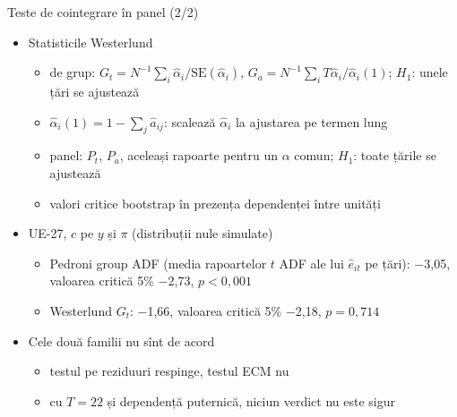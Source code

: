 \begin{frame}{Teste de cointegrare în panel (2/2)}
\itemsize{\small}
\begin{itemize}
    \item Statisticile Westerlund
    \begin{itemize}
        \item de grup: $G_t = N^{-1}\sum_i\hat\alpha_i/\mathrm{SE}(\hat\alpha_i)$, $G_a = N^{-1}\sum_i T\hat\alpha_i/\hat\alpha_i(1)$; $H_1$: unele țări se ajustează
        \item $\hat\alpha_i(1) = 1 - \sum_j\hat a_{ij}$: scalează $\hat\alpha_i$ la ajustarea pe termen lung
        \item panel: $P_t$, $P_a$, aceleași rapoarte pentru un $\alpha$ comun; $H_1$: toate țările se ajustează
        \item valori critice bootstrap în prezența dependenței între unități
    \end{itemize}
    \item UE-27, $c$ pe $y$ și $\pi$ (distribuții nule simulate)
    \begin{itemize}
        \item Pedroni group ADF (media rapoartelor $t$ ADF ale lui $\hat e_{it}$ pe țări): \ensuremath{-}3{,}05, valoarea critică 5\% \ensuremath{-}2{,}73, $p < 0{,}001$
        \item Westerlund $G_t$: \ensuremath{-}1{,}66, valoarea critică 5\% \ensuremath{-}2{,}18, $p = 0{,}714$
    \end{itemize}
    \item Cele două familii nu sînt de acord
    \begin{itemize}
        \item testul pe reziduuri respinge, testul ECM nu
        \item cu $T = 22$ și dependență puternică, niciun verdict nu este sigur
    \end{itemize}
\end{itemize}
\end{frame}

